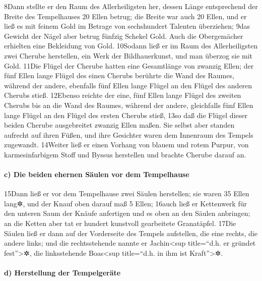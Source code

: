 8Dann stellte er den Raum des Allerheiligsten her, dessen Länge
entsprechend der Breite des Tempelhauses 20 Ellen betrug; die Breite war
auch 20 Ellen, und er ließ es mit feinem Gold im Betrage von
sechshundert Talenten überziehen; 9das Gewicht der Nägel aber betrug
fünfzig Schekel Gold. Auch die Obergemächer erhielten eine Bekleidung
von Gold. 10Sodann ließ er im Raum des Allerheiligsten zwei Cherube
herstellen, ein Werk der Bildhauerkunst, und man überzog sie mit Gold.
11Die Flügel der Cherube hatten eine Gesamtlänge von zwanzig Ellen; der
fünf Ellen lange Flügel des einen Cherubs berührte die Wand des Raumes,
während der andere, ebenfalls fünf Ellen lange Flügel an den Flügel des
anderen Cherubs stieß. 12Ebenso reichte der eine, fünf Ellen lange
Flügel des zweiten Cherubs bis an die Wand des Raumes, während der
andere, gleichfalls fünf Ellen lange Flügel an den Flügel des ersten
Cherubs stieß, 13so daß die Flügel dieser beiden Cherube ausgebreitet
zwanzig Ellen maßen. Sie selbst aber standen aufrecht auf ihren Füßen,
und ihre Gesichter waren dem Innenraum des Tempels zugewandt. 14Weiter
ließ er einen Vorhang von blauem und rotem Purpur, von karmesinfarbigem
Stoff und Byssus herstellen und brachte Cherube darauf an.

\hypertarget{c-die-beiden-ehernen-suxe4ulen-vor-dem-tempelhause}{%
\paragraph{c) Die beiden ehernen Säulen vor dem
Tempelhause}\label{c-die-beiden-ehernen-suxe4ulen-vor-dem-tempelhause}}

15Dann ließ er vor dem Tempelhause zwei Säulen herstellen; sie waren 35
Ellen lang✲, und der Knauf oben darauf maß 5 Ellen; 16auch ließ er
Kettenwerk für den unteren Saum der Knäufe anfertigen und es oben an den
Säulen anbringen; an die Ketten aber tat er hundert kunstvoll
gearbeitete Granatäpfel. 17Die Säulen ließ er dann auf der Vorderseite
des Tempels aufstellen, die eine rechts, die andere links; und die
rechtsstehende nannte er Jachin\textless sup title=``d.h. er gründet
fest''\textgreater✲, die linksstehende Boas\textless sup title=``d.h. in
ihm ist Kraft''\textgreater✲.

\hypertarget{d-herstellung-der-tempelgeruxe4te}{%
\paragraph{d) Herstellung der
Tempelgeräte}\label{d-herstellung-der-tempelgeruxe4te}}

